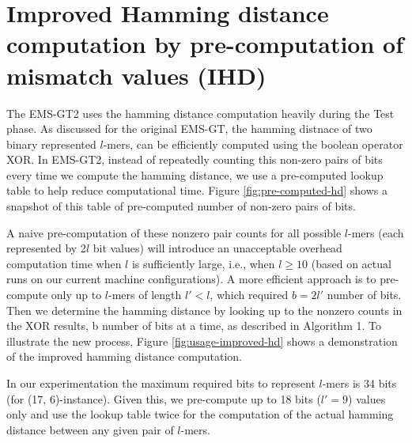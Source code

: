 \section{Improved Hamming distance computation by pre-computation of mismatch values (IHD)}
The EMS-GT2 uses the hamming distance computation heavily during the Test phase. As discussed for the original EMS-GT, the hamming distnace of two binary represented $l$-mers, can be efficiently computed using the boolean operator XOR. In EMS-GT2, instead of repeatedly counting this non-zero pairs of bits every time we compute the hamming distance, we use a pre-computed lookup table to help reduce computational time. Figure \ref{fig:pre-computed-hd} shows a snapshot of this table of pre-computed number of non-zero pairs of bits.



A naive pre-computation of these nonzero pair counts for all possible $l$-mers (each represented by 2$l$ bit values) will introduce an unacceptable overhead computation time when $l$ is sufficiently large, i.e., when $l \geq 10$ (based on actual runs on our current machine configurations). A more efficient approach is to pre-compute only up to $l$-mers of length $l' < l$, which required $b = 2l'$ number of bits. Then we determine the hamming distance by looking up to the nonzero counts in the XOR results, b number of bits at a time, as described in Algorithm 1. To illustrate the new process, Figure \ref{fig:usage-improved-hd} shows a demonstration of the improved hamming distance computation.

 



In our experimentation the maximum required bits to represent $l$-mers is 34 bits (for (17, 6)-instance). Given this, we pre-compute up to 18 bits ($l' = 9$) values only and use the lookup table twice for the computation of the actual hamming distance between any given pair of $l$-mers.








